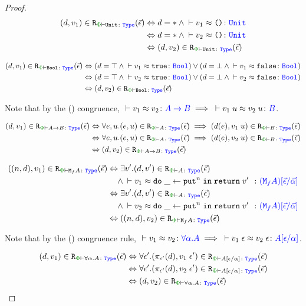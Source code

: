 \begin{proof}
    
    \begin{align*}
        \inLogRelPE{d}{v_1}{\U} & \Leftrightarrow d = \singleton \wedge \zberelation{v_1}{\u}{\U}
        \\ &
        \Leftrightarrow d = \singleton \wedge \zberelation{v_2}{\u}{\U}
        \\ & 
        \Leftrightarrow  \inLogRelPE{d}{v_2}{\U}
    \end{align*}

\begin{align*}
    \inLogRelPE{d}{v_1}{\B} & \Leftrightarrow (d = \top \wedge \zberelation{v_1}{\t}{\B}) \vee (d = \bot \wedge \zberelation{v_1}{\f}{\B})
    \\ &
    \Leftrightarrow (d = \top \wedge \zberelation{v_2}{\t}{\B}) \vee (d = \bot \wedge \zberelation{v_2}{\f}{\B})
    \\ & 
    \Leftrightarrow  \inLogRelPE{d}{v_2}{\B}
\end{align*}

\case{\tfun}
Note that by the (\textit{\eqapply}) congruence, $\zberelation{v_1}{v_2}{\ab}\implies \zberelation{\apply{v_1}{u}}{\apply{v_2}{u}}{B}$.

\begin{align*}
    \inLogRelPE{d}{v_1}{\ab} & \Leftrightarrow \forall e, u. \inLogRelPE{e}{u}{A} \implies \inLogRelPE{d(e)}{\apply{v_1}{u}}{B} \\
    & \Leftrightarrow  \forall e, u. \inLogRelPE{e}{u}{A} \implies \inLogRelPE{d(e)}{\apply{v_2}{u}}{B} \\
    & \Leftrightarrow  \inLogRelPE{d}{v_2}{\ab}
\end{align*}

\case{\teffect}
\begin{align*}
    \inLogRelPE{(n, d)}{v_1}{\M{f}{A}} & \Leftrightarrow \exists v'. \inLogRelPE{d}{v'}{A}
    \\ & \quad\wedge \zberelation{v_1}{\doin{\_}{\put^n}{\return{v'}}}{(\M{f}{A})\ssub{\av}{\ev}}
    \\
    & \Leftrightarrow\exists v'. \inLogRelPE{d}{v'}{A}
    \\ & \quad\wedge \zberelation{v_2}{\doin{\_}{\put^n}{\return{v'}}}{(\M{f}{A})\ssub{\av}{\ev}} \\
    & \Leftrightarrow  \inLogRelPE{(n, d)}{v_2}{\M{f}{A}}
\end{align*}

\case{\tquant}
Note that by the (\textit{\eqspec}) congruence rule, $\zberelation{v_1}{v_2}{\all{\a}{A}} \implies \zberelation{\eapp{v_1}{\e}}{\eapp{v_2}{\e}}{A\ssub{\a}{\e}}$.

\begin{align*}
    \inLogRelPE{d}{v_1}{\all{\a}{A}} & \Leftrightarrow \forall \e'. \inLogRelPE{\pi_{\e'}(d)}{\eapp{v_1}{\e'}}{A\ssub{\a}{\e}}
    \\ & \Leftrightarrow \forall \e'. \inLogRelPE{\pi_{\e'}(d)}{\eapp{v_2}{\e'}}{A\ssub{\a}{\e}}
    \\ & \Leftrightarrow\inLogRelPE{d}{v_2}{\all{\a}{A}}
\end{align*}
\end{proof}
